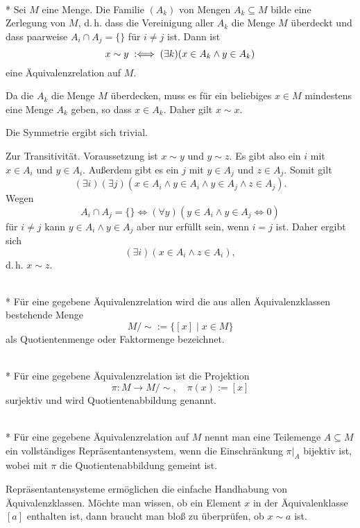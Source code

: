 \begin{Satz}\mbox{}\\*
Sei $M$ eine Menge. Die Familie $(A_k)$ von Mengen $A_k\subseteq M$
bilde eine Zerlegung von $M$, d.\,h. dass die Vereinigung aller
$A_k$ die Menge $M$ überdeckt und dass paarweise $A_i\cap A_j=\{\}$
für $i\ne j$ ist. Dann ist%
\[x\sim y\;:\Longleftrightarrow\; (\exists k)(x\in A_k\land y\in A_k)\]
eine Äquivalenzrelation auf $M$.
\end{Satz}
 Da die $A_k$ die Menge $M$ überdecken,
muss es für ein beliebiges $x\in M$ mindestens eine Menge $A_k$
geben, so dass $x\in A_k$. Daher gilt $x\sim x$.

Die Symmetrie ergibt sich trivial.

Zur Transitivität. Voraussetzung ist $x\sim y$ und $y\sim z$.
Es gibt also ein $i$ mit $x\in A_i$ und $y\in A_i$. Außerdem gibt
es ein $j$ mit $y\in A_j$ und $z\in A_j$. Somit gilt%
\[(\exists i)(\exists j)(x\in A_i\land y\in A_i\land y\in A_j\land z\in A_j).\]
Wegen
\[A_i\cap A_j = \{\} \iff (\forall y)(y\in A_i\land y\in A_j\iff 0)\]
für $i\ne j$ kann $y\in A_i\land y\in A_j$ aber nur erfüllt sein,
wenn $i=j$ ist. Daher ergibt sich%
\[(\exists i)(x\in A_i\land z\in A_i),\]
d.\,h. $x\sim z$.\;\qedsymbol

\begin{Definition}[Quotientenmenge]\mbox{}\\*
Für eine gegebene Äquivalenzrelation wird die aus allen
Äquivalenzklassen bestehende Menge
\[M/{\sim} := \{[x]\mid x\in M\}\]
als Quotientenmenge oder Faktormenge bezeichnet.
\end{Definition}

\begin{Definition}[Quotientenabbildung]\mbox{}\\*
Für eine gegebene Äquivalenzrelation ist die Projektion
\[\pi\colon M\to M/{\sim},\quad \pi(x):=[x]\]
surjektiv und wird Quotientenabbildung genannt.
\end{Definition}

\newpage
\begin{Definition}[Repräsentantensystem]\mbox{}\\*
Für eine gegebene Äquivalenzrelation auf $M$ nennt man eine
Teilemenge $A\subseteq M$ ein vollständiges Repräsentantensystem,
wenn die Einschränkung $\pi|_A$ bijektiv ist, wobei mit $\pi$
die Quotientenabbildung gemeint ist.
\end{Definition}
Repräsentantensysteme ermöglichen die einfache Handhabung von
Äquivalenzklassen. Möchte man wissen, ob ein Element $x$ in der
Äquivalenklasse $[a]$ enthalten ist, dann braucht man bloß
zu überprüfen, ob $x\sim a$ ist.

